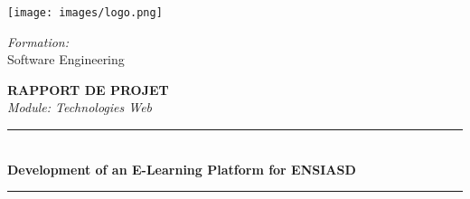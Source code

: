 \documentclass[12pt,a4paper]{article}
\begin{document}
\begin{titlepage}

  \begin{center}
    \vspace*{-3cm} %
    \texttt{[image: images/logo.png]}\\[0.1cm]
    \vspace*{0.2cm} %
  \end{center}

  \begin{center}
    {\Large \emph{Formation:}}\\[0.2cm] %
    {\large Software Engineering} \\[0.7cm] %

    \begin{center}
      \colorbox{white!90}{\parbox{0.8\textwidth}{
        \centering
        \vspace{0.2cm} %
        {\Large\bfseries RAPPORT DE PROJET}\\[0.1cm] %
        {\large\textit{Module: Technologies Web}}
        \vspace{0.2cm} %
      }}
    \end{center}
    \vspace{0.5cm} %

    \rule{\linewidth}{0.5mm} \\[0.1cm]
    {\huge \bfseries Development of an E-Learning Platform for ENSIASD \\[0.1cm]}
    \rule{\linewidth}{0.5mm} \\[1cm] %
    
    \begin{center}
       \hspace{1cm}
       \hspace{1cm}
       \hspace{1cm}
    \end{center}

    \vspace{6cm} %


\end{center}
\end{titlepage}
\end{document}
